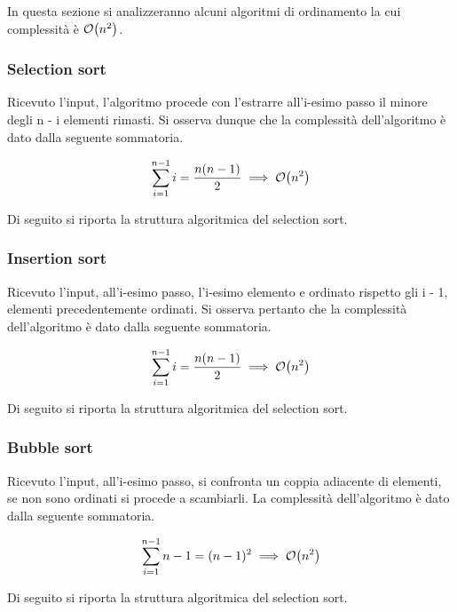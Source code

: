 \documentclass{subfiles}
\begin{document}
In questa sezione si analizzeranno alcuni algoritmi di ordinamento la cui complessità è \(\order{n^{2}}\).

\subsubsection{Selection sort}
Ricevuto l'input, l'algoritmo procede con l'estrarre all'i-esimo passo il minore degli n - i elementi rimasti.
Si osserva dunque che la complessità dell'algoritmo è dato dalla seguente sommatoria.

\[
    \sum\limits_{i = 1}^{n - 1}{i} = \frac{n(n - 1)}{2} \implies \order{n^{2}}
\]

\noindent Di seguito si riporta la struttura algoritmica del selection sort.


\subsubsection{Insertion sort}
Ricevuto l'input, all'i-esimo passo, l'i-esimo elemento e ordinato rispetto gli i - 1, elementi precedentemente ordinati.
Si osserva pertanto che la complessità dell'algoritmo è dato dalla seguente sommatoria.

\[
    \sum\limits_{i = 1}^{n - 1}{i} = \frac{n(n - 1)}{2} \implies \order{n^{2}}
\]

\noindent Di seguito si riporta la struttura algoritmica del selection sort.


\subsubsection{Bubble sort}
Ricevuto l'input, all'i-esimo passo, si confronta un coppia adiacente di elementi, se non sono ordinati si procede a scambiarli.
La complessità dell'algoritmo è dato dalla seguente sommatoria.

\[
    \sum\limits_{i = 1}^{n - 1}{n - 1} = (n -1)^{2} \implies \order{n^{2}}
\]

\noindent Di seguito si riporta la struttura algoritmica del selection sort.

\end{document}

